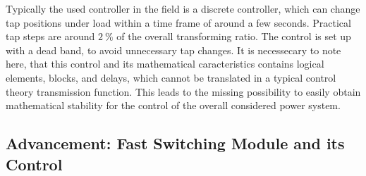 Typically the used controller in the field is a discrete controller, which can change tap positions under load within a time frame of around a few seconds. 
Practical tap steps are around $2~\mathrm{\%}$ of the overall transforming ratio. 
The control is set up with a dead band, to avoid unnecessary tap changes. 
It is necessecary to note here, that this control and its mathematical caracteristics contains logical elements, blocks, and delays, which cannot be translated in a typical control theory transmission function. 
This leads to the missing possibility to easily obtain mathematical stability for the control of the overall considered power system. \autocite{machowski_2020,kundur_2022}

\subsection{Advancement: Fast Switching Module and its Control}
\label{sec:fsm-description}

